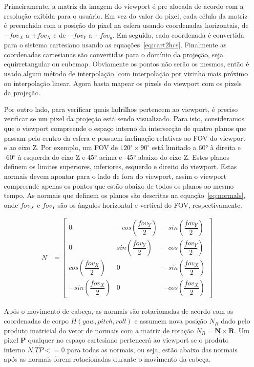 {Primeiramente, a matriz da imagem do viewport é pre alocada de acordo com a resolução exibida para o usuário. Em vez do valor do pixel, cada célula da matriz é preenchida com a posição do pixel na esfera usando coordenadas horizontais, de $-fov_X$ a $+fov_X$ e de $-fov_Y$ a $+fov_y$. Em seguida, cada coordenada é convertida para o sistema cartesiano usando as equações~\ref{eq:cart2hcs}. Finalmente as coordenadas cartesianas são convertidas para o domínio da projeção, seja equirretangular ou cubemap. Obviamente os pontos não serão os mesmos, então é usado algum método de interpolação, com interpolação por vizinho mais próximo ou interpolação linear. Agora basta mapear os pixels do viewport com os pixels da projeção.

Por outro lado, para verificar quais ladrilhos pertencem ao viewport, é preciso verificar se um pixel da projeção está sendo visualizado. Para isto, consideramos que o viewport compreende o espaço interno da intersecção de quatro planos que passam pelo centro da esfera e possuem inclinação relativas ao FOV do viewport e ao eixo Z. Por exemplo, um FOV de $ 120^\circ\times 90^\circ $ está limitado a 60° à direita e -60° à esquerda do eixo Z e 45° acima e -45° abaixo do eixo Z. Estes planos definem os limites superiores, inferiores, esquerdo e direito do viewport. Estas normais devem apontar para o lado de fora do viewport, assim o viewport compreende apenas os pontos que estão abaixo de todos os planos ao mesmo tempo. As normais que definem os planos são descritas na equação~\ref{eq:normals}, onde $fov_X$ e $fov_Y$ são os ângulos horizontal e vertical do FOV, respectivamente.

\begin{align}
        N &=\begin{bmatrix}
                0 & -cos\left(\dfrac{fov_Y}{2}\right) & -sin\left(\dfrac{fov_Y}{2}\right) \\
                0 & sin\left(\dfrac{fov_Y}{2}\right) & -cos\left(\dfrac{fov_Y}{2}\right) \\
                cos\left(\dfrac{fov_X}{2}\right) & 0 & -sin\left(\dfrac{fov_X}{2}\right)\\
                -sin\left(\dfrac{fov_X}{2}\right) & 0 & -cos\left(\dfrac{fov_X}{2}\right)
        \end{bmatrix}
        \label{eq:normals}
\end{align}

Após o movimento de cabeça, as normais são rotacionadas de acordo com as coordenadas de corpo $H(yaw, pitch, roll)$ e assumem nova posição $ N_R $ dado pelo produto matricial do vetor de normais com a matriz de rotação $ N_R = \textbf{N} \times \textbf{R}$. Um pixel $ \textbf{P}$ qualquer no espaço cartesiano pertencerá ao viewport se o produto interno $ N.T \dot P <=0 $ para todas as normais, ou seja, estão abaixo das normais após as normais forem rotacionadas durante o movimento da cabeça.

}
